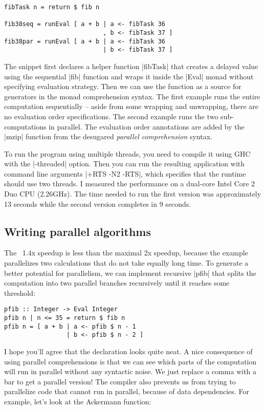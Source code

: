 \documentclass{tmr}
\begin{document}
\begin{verbatim}
fibTask n = return $ fib n

fib38seq = runEval [ a + b | a <- fibTask 36
                           , b <- fibTask 37 ]
fib38par = runEval [ a + b | a <- fibTask 36
                           | b <- fibTask 37 ]
\end{verbatim}

The snippet first declares a helper function |fibTask| that creates a delayed value using 
the sequential |fib| function and wraps it inside the |Eval| monad without specifying evaluation
strategy. Then we can use the function as a source for generators in the monad comprehension
syntax. The first example runs the entire computation sequentially -- aside from some wrapping
and unwrapping, there are no evaluation order specifications. The second example runs the 
two sub-computations in parallel. The evaluation order annotations are added by the |mzip| 
function from the desugared \textit{parallel comprehension} syntax.

To run the program using multiple threads, you need to compile it using GHC with the |-threaded|
option. Then you can run the resulting application with command line arguments |+RTS -N2 -RTS|,
which specifies that the runtime should use two threads. I measured the performance on a dual-core 
Intel Core 2 Duo CPU (2.26GHz). The time needed to run the first version was approximately 13 
seconds while the second version completes in 9 seconds.

\subsection{Writing parallel algorithms}
The ~1.4x speedup is less than the maximal 2x speedup, because the example parallelizes two 
calculations that do not take equally long time. To generate a better potential for parallelism,
we can implement recursive |pfib| that splits the computation into two parallel branches 
recursively until it reaches some threshold:

\begin{verbatim}
pfib :: Integer -> Eval Integer
pfib n | n <= 35 = return $ fib n
pfib n = [ a + b | a <- pfib $ n - 1 
                 | b <- pfib $ n - 2 ]
\end{verbatim}
I hope you'll agree that the declaration looks quite neat. A nice consequence of using parallel 
comprehensions is that we can see which parts of the computation will run in parallel without any 
syntactic noise. We just replace a comma with a bar to get a parallel version! The compiler also 
prevents us from trying to parallelize code that cannot run in parallel, because of data 
dependencies. For example, let's look at the Ackermann function: 
\end{document}

